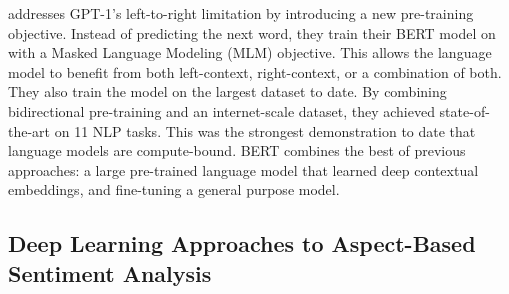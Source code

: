 \cite{DBLP:journals/corr/abs-1810-04805} addresses GPT-1’s left-to-right limitation by introducing a new pre-training objective. Instead of predicting the next word, they train their BERT model on with a Masked Language Modeling (MLM) objective. This allows the language model to benefit from both left-context, right-context, or a combination of both. They also train the model on the largest dataset to date. By combining bidirectional pre-training and an internet-scale dataset, they achieved state-of-the-art on 11 NLP tasks. This was the strongest demonstration to date that language models are compute-bound. BERT combines the best of previous approaches: a large pre-trained language model that learned deep contextual embeddings, and fine-tuning a general purpose model.



















\subsection{Deep Learning Approaches to Aspect-Based Sentiment Analysis}













